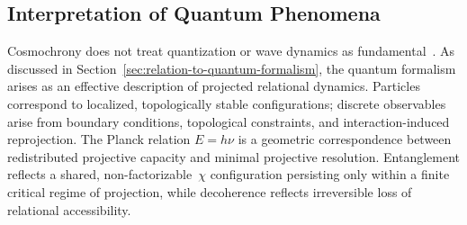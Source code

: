 \subsection{Interpretation of Quantum Phenomena}
  \label{subsec:interpretation-of-quantum-phenomena}

  Cosmochrony does not treat quantization or wave dynamics as
  fundamental~\cite{PeskinSchroeder1995QFT}.
  As discussed in Section~\ref{sec:relation-to-quantum-formalism},
  the quantum formalism arises as an effective description of
  projected relational dynamics.
  Particles correspond to localized, topologically stable configurations;
  discrete observables arise from boundary conditions, topological
  constraints, and interaction-induced reprojection.
  The Planck relation $E = h\nu$ is a geometric correspondence between
  redistributed projective capacity and minimal projective resolution.
  Entanglement reflects a shared, non-factorizable~$\chi$ configuration
  persisting only within a finite critical regime of projection, while
  decoherence reflects irreversible loss of relational accessibility.
